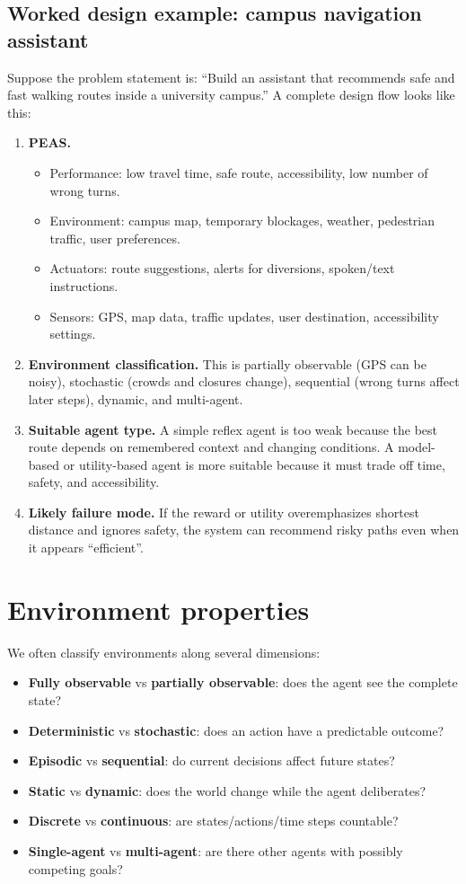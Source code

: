 \documentclass[11pt]{article}
\begin{document}
\subsection{Worked design example: campus navigation assistant}
Suppose the problem statement is: ``Build an assistant that recommends safe and fast walking routes inside a university campus.'' A complete design flow looks like this:
\begin{enumerate}[leftmargin=*]
  \item \textbf{PEAS.}
  \begin{itemize}[leftmargin=*]
    \item Performance: low travel time, safe route, accessibility, low number of wrong turns.
    \item Environment: campus map, temporary blockages, weather, pedestrian traffic, user preferences.
    \item Actuators: route suggestions, alerts for diversions, spoken/text instructions.
    \item Sensors: GPS, map data, traffic updates, user destination, accessibility settings.
  \end{itemize}
  \item \textbf{Environment classification.} This is partially observable (GPS can be noisy), stochastic (crowds and closures change), sequential (wrong turns affect later steps), dynamic, and multi-agent.
  \item \textbf{Suitable agent type.} A simple reflex agent is too weak because the best route depends on remembered context and changing conditions. A model-based or utility-based agent is more suitable because it must trade off time, safety, and accessibility.
  \item \textbf{Likely failure mode.} If the reward or utility overemphasizes shortest distance and ignores safety, the system can recommend risky paths even when it appears ``efficient''.
\end{enumerate}

\section{Environment properties}
We often classify environments along several dimensions:
\begin{itemize}[leftmargin=*]
  \item \textbf{Fully observable} vs \textbf{partially observable}: does the agent see the complete state?
  \item \textbf{Deterministic} vs \textbf{stochastic}: does an action have a predictable outcome?
  \item \textbf{Episodic} vs \textbf{sequential}: do current decisions affect future states?
  \item \textbf{Static} vs \textbf{dynamic}: does the world change while the agent deliberates?
  \item \textbf{Discrete} vs \textbf{continuous}: are states/actions/time steps countable?
  \item \textbf{Single-agent} vs \textbf{multi-agent}: are there other agents with possibly competing goals?
\end{itemize}
\end{document}
